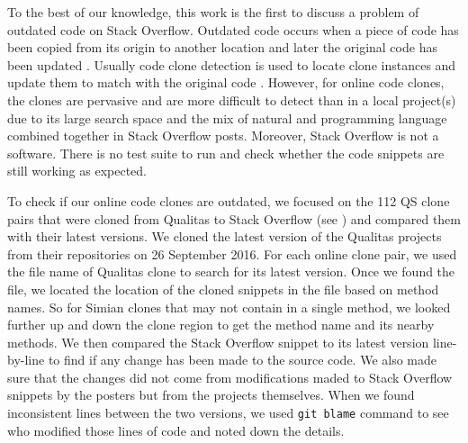 \documentclass[sigconf,review, anonymous]{acmart}
\begin{document}

To the best of our knowledge, this work is the first to discuss a problem of outdated code on Stack Overflow. Outdated code occurs when a piece of code has been copied from its origin to another location and later the original code has been updated \cite{Xia2014}. Usually code clone detection is used to locate clone instances and update them to match with the original code \cite{Bellon2007}. However, for online code clones, the clones are pervasive and are more difficult to detect than in a local project(s) due to its large search space and the mix of natural and programming language combined together in Stack Overflow posts. Moreover, Stack Overflow is not a software. There is no test suite to run and check whether the code snippets are still working as expected.

To check if our online code clones are outdated, we focused on the 112 QS clone pairs that were cloned from Qualitas to Stack Overflow (see ) and compared them with their latest versions. We cloned the latest version of the Qualitas projects from their repositories on 26 September 2016. For each online clone pair, we used the file name of Qualitas clone to search for its latest version. Once we found the file, we located the location of the cloned snippets in the file based on method names. So for Simian clones that may not contain in a single method, we looked further up and down the clone region to get the method name and its nearby methods. We then compared the Stack Overflow snippet to its latest version line-by-line to find if any change has been made to the source code. We also made sure that the changes did not come from modifications maded to Stack Overflow snippets by the posters but from the projects themselves. When we found inconsistent lines between the two versions, we used \texttt{git blame} command to see who modified those lines of code and noted down the details.
\end{document}
